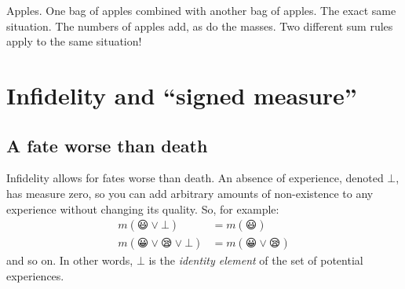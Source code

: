 \documentclass[a4paper, 12pt]{article}
\begin{document}
Apples.
One bag of apples combined with another bag of apples.
The exact same situation. The numbers of apples add, as
do the masses. Two different sum rules apply to the same
situation!


\section{Infidelity and ``signed measure''}

\subsection{A fate worse than death}

Infidelity allows for fates worse than death.
An absence of experience, denoted $\bot$,
has measure zero, so you can add arbitrary amounts
of non-existence to any experience without changing
its quality. So, for example:
\begin{align}
m(😃 \vee \bot)        &= m(😃)\\
m(😀 \vee 😪 \vee \bot) &= m(😀 \vee 😪)
\end{align}
and so on.
In other words, $\bot$ is the {\em identity element}
of the set of potential experiences.
\end{document}
